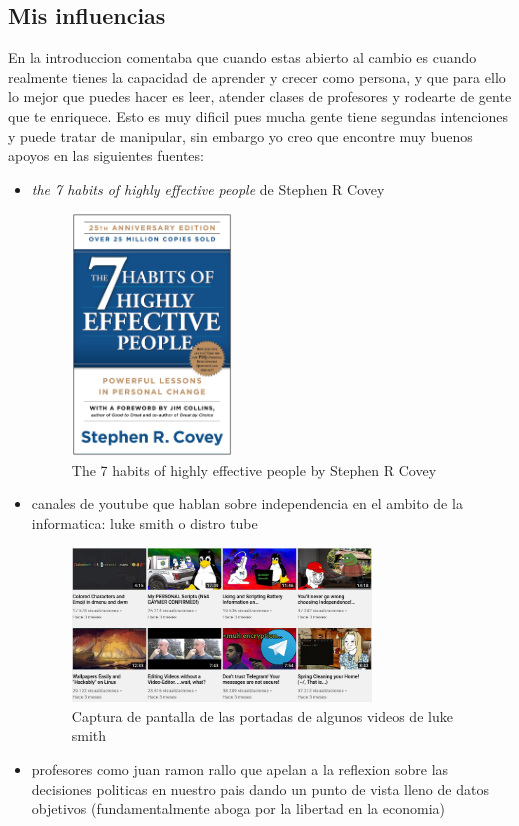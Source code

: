 \subsection{Mis influencias}
En la introduccion comentaba que cuando estas abierto al cambio es cuando realmente tienes la capacidad de aprender y crecer como persona, y que para ello lo mejor que puedes hacer es leer, atender clases de profesores y rodearte de gente que te enriquece. Esto es muy dificil pues mucha gente tiene segundas intenciones y puede tratar de manipular, sin embargo yo creo que encontre muy buenos apoyos en las siguientes fuentes:
\begin{itemize}
	\item{ \textit{the 7 habits of highly effective people} de Stephen R Covey 
		\begin{figure}[h]
			\centering
			\includegraphics[width=0.4\textwidth]{figures/the7habits.jpg}
			\caption{The 7 habits of highly effective people by Stephen R Covey}
		\end{figure}
	}
\item{ canales de youtube que hablan sobre independencia en el ambito de la informatica: luke smith o distro tube
		\begin{figure}[H]
			\centering
			\includegraphics[width=0.75\textwidth]{figures/luke-smith.png}
			\caption{Captura de pantalla de las portadas de algunos videos de luke smith}
		\end{figure}
	}
	\item profesores como juan ramon rallo que apelan a la reflexion sobre las decisiones politicas en nuestro pais dando un punto de vista lleno de datos objetivos (fundamentalmente aboga por la libertad en la economia)
\end{itemize}

